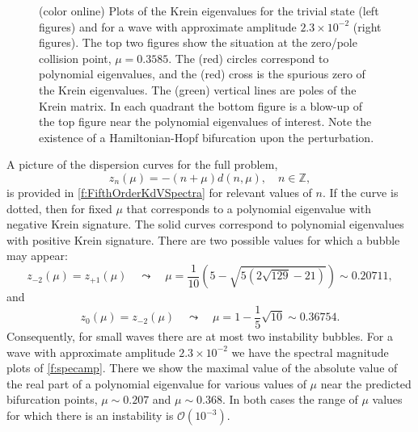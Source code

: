 \documentclass[review,onefignum,onetabnum]{siamart171218}
\newcommand{\Z}{\mathbb{Z}}
\newcommand{\calO}{\mathcal{O}}
\begin{document}
\begin{figure}[ht]
\begin{center}
\begin{tabular}{cc}
\end{tabular}
\caption{(color online) Plots of the Krein eigenvalues for the trivial state (left figures) and for
a wave with approximate amplitude $2.3\times10^{-2}$ (right figures). The top two figures show the
situation at the zero/pole collision
point, $\mu=0.3585$. The (red) circles correspond to polynomial eigenvalues, and the (red) cross
is the spurious zero of the Krein eigenvalues. The (green) vertical lines are poles
of the Krein matrix. In each quadrant the bottom figure is a blow-up
of the top figure near the polynomial eigenvalues of interest. Note the existence of a Hamiltonian-Hopf bifurcation upon the perturbation.}
\label{f:KreinEvalCollide2}
\end{center}
\end{figure}

A picture of the dispersion curves for the full problem,
\[
z_n(\mu)=-(n+\mu)d(n,\mu),\quad n\in\Z,
\]
is provided in \cref{f:FifthOrderKdVSpectra} for relevant values of $n$.
If the curve is dotted, then for fixed $\mu$ that corresponds to a polynomial
eigenvalue with negative Krein signature. The solid curves correspond to
polynomial eigenvalues with positive Krein signature. There are two possible
values for which a bubble may appear:
\[
z_{-2}(\mu)=z_{+1}(\mu)\quad\leadsto\quad
\mu=\frac1{10}\left(5-\sqrt{5(2\sqrt{129}-21)}\right)\sim0.20711,
\]
and
\[
z_0(\mu)=z_{-2}(\mu)\quad\leadsto\quad
\mu=1-\frac15\sqrt{10}\sim0.36754.
\]
Consequently, for small waves there are at most two instability bubbles.
For a wave with approximate amplitude $2.3\times10^{-2}$ we have the spectral
magnitude plots of \cref{f:specamp}. There we show the maximal value of
the absolute value of the real part of a polynomial eigenvalue for various
values of $\mu$ near the predicted bifurcation points, $\mu\sim0.207$ and
$\mu\sim0.368$. In both cases the range of $\mu$ values for which there is an
instability is $\calO(10^{-3})$.
\end{document}
